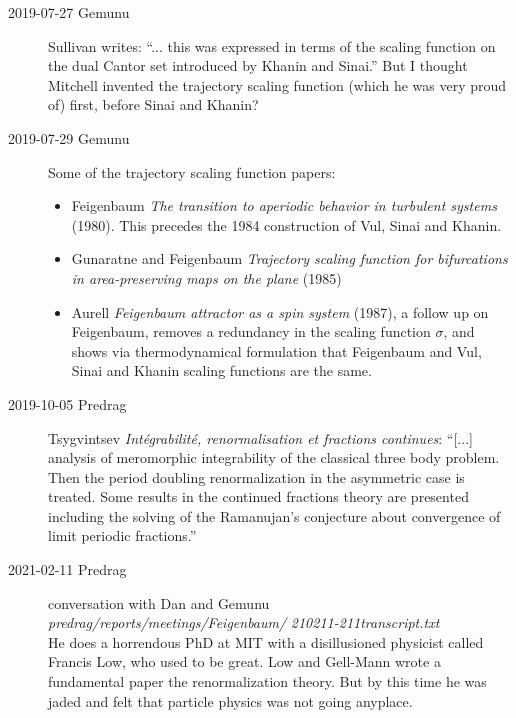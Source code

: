 \begin{description}
\item[2019-07-27 Gemunu]
Sullivan writes: ``... this was expressed in terms of the scaling
function on the dual Cantor set introduced by Khanin and Sinai.'' But I
thought Mitchell invented the trajectory scaling function (which he was
very proud of) first, before Sinai and Khanin?

\item[2019-07-29 Gemunu]
Some of the trajectory scaling function papers:
\begin{itemize}
  \item
Feigenbaum
{\em The transition to aperiodic behavior in turbulent systems} (1980).
This precedes the 1984 construction
of Vul, Sinai and Khanin.
  \item
Gunaratne and Feigenbaum {\em Trajectory scaling function
for bifurcations in area-preserving maps on the plane} (1985)
  \item
Aurell
{\em Feigenbaum attractor as a spin system} (1987),
a follow up on Feigenbaum, removes a redundancy in
the scaling function $\sigma$, and shows via thermodynamical formulation
that Feigenbaum and Vul, Sinai and Khanin
scaling functions are the same.
\end{itemize}

\item[2019-10-05 Predrag]
Tsygvintsev
{\em Int{\'e}grabilit{\'e}, renormalisation et fractions continues}:
``[...] analysis of meromorphic integrability of the classical three body
problem. Then the period doubling renormalization in the asymmetric case
is treated. Some results in the continued fractions theory are presented
including the solving of the Ramanujan's conjecture about convergence of
limit periodic fractions.''

\item[2021-02-11 Predrag] conversation with Dan and Gemunu\\
\emph{predrag/reports/meetings/Feigenbaum/}
\emph{210211-211transcript.txt}\\

He does a horrendous PhD at MIT with a disillusioned physicist
called Francis Low, who used to be great. Low and Gell-Mann wrote a
fundamental paper the renormalization theory. But by this time he
was jaded and felt that particle physics was not going anyplace.


\end{description}
